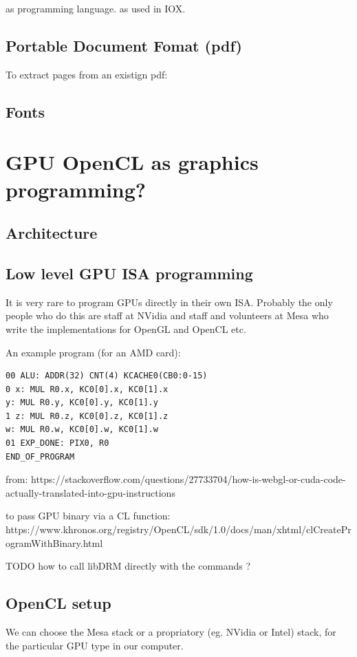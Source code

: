 \documentclass[oneside,english]{scrbook}
\begin{document}
as programming language. as used in IOX.


\section{Portable Document Fomat (pdf)}

To extract pages from an existign pdf:


\section{Fonts}


\chapter{GPU OpenCL as graphics programming?}

\section{Architecture}

\section{Low level GPU ISA programming}

It is very rare to program GPUs directly in their own ISA.  Probably the only people who do this are staff at NVidia and staff and volunteers at Mesa who write the implementations for OpenGL and OpenCL etc.

An example program (for an AMD card):

\begin{lstlisting}
00 ALU: ADDR(32) CNT(4) KCACHE0(CB0:0-15)   
0 x: MUL R0.x, KC0[0].x, KC0[1].x    
y: MUL R0.y, KC0[0].y, KC0[1].y
1 z: MUL R0.z, KC0[0].z, KC0[1].z
w: MUL R0.w, KC0[0].w, KC0[1].w
01 EXP_DONE: PIX0, R0
END_OF_PROGRAM
\end{lstlisting}

from:
https://stackoverflow.com/questions/27733704/how-is-webgl-or-cuda-code-actually-translated-into-gpu-instructions

to pass GPU binary via a CL function:
https://www.khronos.org/registry/OpenCL/sdk/1.0/docs/man/xhtml/clCreateProgramWithBinary.html

TODO how to call libDRM directly with the commands ?

\section{OpenCL setup}
We can choose the Mesa stack or a propriatory (eg. NVidia or Intel) stack, for the particular GPU type in our computer.
\end{document}
